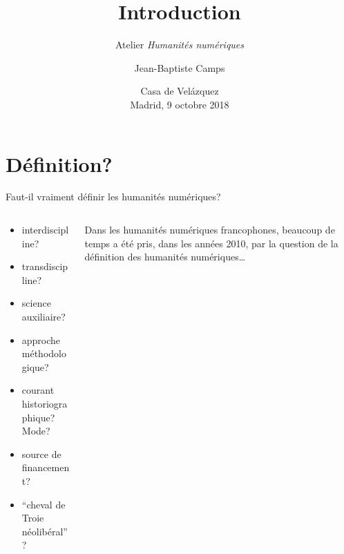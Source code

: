 \documentclass[ignorenonframetext]{beamer}
\institute{École nationale des chartes | Paris, Sciences \& Lettres}
\title{Introduction}
\subtitle{Atelier \textit{Humanités numériques}}
\author{Jean-Baptiste Camps}
\date[Madrid, 9 oct. 2018]{Casa de Velázquez\\ Madrid, 9 octobre 2018}
\begin{document}
\frame{\maketitle}

  







\section{Définition?}

\begin{frame}{Faut-il vraiment définir les humanités numériques?}

	\begin{columns}
	\begin{column}{0.45\textwidth}
		\begin{itemize}
			\item interdiscipline?
			\item transdiscipline?
			\item science auxiliaire?
			\item approche méthodologique?
			\item courant historiographique? Mode?
			\item source de financement?
			\item ``cheval de Troie néolibéral''?
		\end{itemize}
	\end{column}
	\begin{column}{0.45\textwidth}
		Dans les humanités numériques francophones, beaucoup de temps a été pris, dans les années 2010, par la question de la \alert{définition} des humanités numériques…
	\end{column}
\end{columns}

\end{frame}
\end{document}
